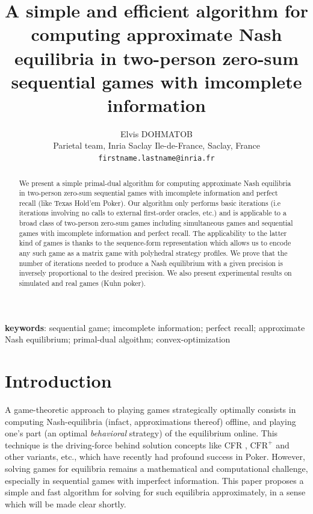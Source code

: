 \documentclass{article} %
\title{
  A simple and efficient algorithm for computing approximate
  Nash equilibria in two-person zero-sum sequential games with imcomplete
  information}
\author{Elvis DOHMATOB
\\Parietal team, Inria Saclay Ile-de-France, Saclay, France
\\\texttt{firstname.lastname@inria.fr}
}
\begin{document}
\maketitle
\begin{abstract}We present a simple primal-dual algorithm for
  computing approximate Nash equilibria in two-person zero-sum
  sequential games with  imcomplete information and perfect recall
  (like Texas Hold'em Poker). Our algorithm only performs basic
  iterations (i.e iterations involving no calls to external
  first-order oracles, etc.)
  and is applicable to a broad class of two-person zero-sum games
  including simultaneous games and sequential games with imcomplete
  information and perfect recall. The applicability to the latter kind
  of games is thanks to the sequence-form representation
  \cite{koller1992complexity} which allows us to encode any such game
  as a matrix game with polyhedral strategy profiles. We prove that
  the number of iterations needed to produce a Nash equilibrium with a
  given precision is inversely proportional to the desired
  precision. We also present experimental results on simulated and
  real games (Kuhn poker).
\end{abstract}

\textbf{keywords}: sequential game; imcomplete information; perfect
recall; approximate Nash equilibrium; primal-dual
algoithm; convex-optimization

\section{Introduction}
\label{sec:intro}
A game-theoretic approach to playing games strategically optimally
consists in computing Nash-equilibria (infact, approximations thereof)
offline, and playing one's part (an optimal \textit{behavioral}
strategy) of the equilibrium online. This
technique is the driving-force behind solution concepts like CFR
\cite{zinkevich2008regret,lanctot2009monte},
$\text{CFR}^{+}$ \cite{tammelin14} and other variants, etc., which
have recently had profound success in Poker. However, solving games
for equilibria remains a mathematical and computational challenge,
especially in sequential games with imperfect information. This paper
proposes a simple and fast algorithm for solving for such equilibria
approximately, in a sense which will be made clear shortly.
\end{document}
